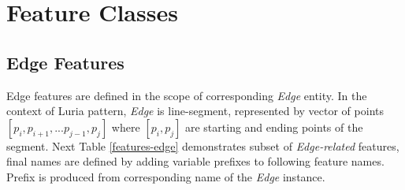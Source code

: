 

\section{Feature Classes}

\subsection{Edge Features}

Edge features are defined in the scope of corresponding \textit{Edge} entity. In the context of Luria pattern, \textit{Edge} is line-segment, represented by vector of points $[p_i, p_{i+1}, ... p_{j-1}, p_j]$ where $[p_i, p_j]$ are starting and ending points of the segment. Next Table \ref{features-edge} demonstrates subset of \textit{Edge-related} features, final names are defined by adding variable prefixes to following feature names. Prefix is produced from corresponding name of the \textit{Edge} instance.

